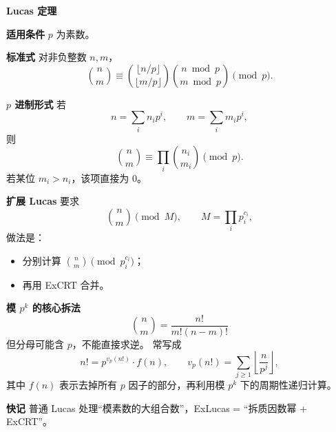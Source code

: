 \textbf{Lucas 定理}

\textbf{适用条件}
$p$ 为素数。

\textbf{标准式}
对非负整数 $n,m$，
\[
\binom{n}{m}\equiv
\binom{\lfloor n/p\rfloor}{\lfloor m/p\rfloor}
\binom{n\bmod p}{m\bmod p}
\pmod p.
\]

\textbf{$p$ 进制形式}
若
\[
n=\sum_i n_ip^i,\qquad m=\sum_i m_ip^i,
\]
则
\[
\binom{n}{m}\equiv \prod_i \binom{n_i}{m_i}\pmod p.
\]
若某位 $m_i>n_i$，该项直接为 $0$。

\textbf{扩展 Lucas}
要求
\[
\binom{n}{m}\pmod M,\qquad M=\prod_i p_i^{c_i},
\]
做法是：
\begin{itemize}
\item 分别计算 $\binom{n}{m}\pmod{p_i^{c_i}}$；
\item 再用 ExCRT 合并。
\end{itemize}

\textbf{模 $p^k$ 的核心拆法}
\[
\binom{n}{m}=\frac{n!}{m!(n-m)!}
\]
但分母可能含 $p$，不能直接求逆。
常写成
\[
n!=p^{v_p(n!)}\cdot f(n),\qquad
v_p(n!)=\sum_{j\ge 1}\left\lfloor\frac{n}{p^j}\right\rfloor,
\]
其中 $f(n)$ 表示去掉所有 $p$ 因子的部分，再利用模 $p^k$ 下的周期性递归计算。

\textbf{快记}
普通 Lucas 处理“模素数的大组合数”，ExLucas = “拆质因数幂 + ExCRT”。
